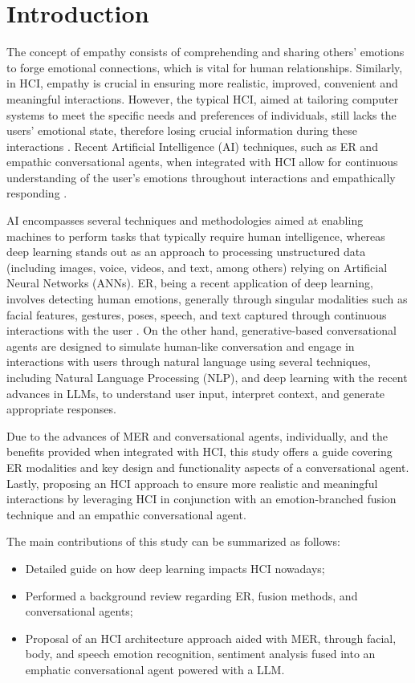\documentclass[runningheads]{llncs}
\begin{document}
\section{Introduction}

The concept of empathy consists of comprehending and sharing others' emotions to forge emotional connections, which is vital for human relationships. Similarly, in HCI, empathy is crucial in ensuring more realistic, improved, convenient and meaningful interactions. However, the typical HCI, aimed at tailoring computer systems to meet the specific needs and preferences of individuals, still lacks the users' emotional state, therefore losing crucial information during these interactions \cite{jaiswal_facial_2020}.  Recent Artificial Intelligence (AI) techniques, such as ER and empathic conversational agents, when integrated with HCI allow for continuous understanding of the user's emotions throughout interactions and empathically responding \cite{santos_approaches_2018}.

AI encompasses several techniques and methodologies aimed at enabling machines to perform tasks that typically require human intelligence, whereas deep learning stands out as an approach to processing unstructured data (including images, voice, videos, and text, among others) relying on Artificial Neural Networks (ANNs). ER, being a recent application of deep learning, involves detecting human emotions, generally through singular modalities such as facial features, gestures, poses, speech, and text captured through continuous interactions with the user \cite{alrowais_modified_2023}. On the other hand, generative-based conversational agents are designed to simulate human-like conversation and engage in interactions with users through natural language using several techniques, including Natural Language Processing (NLP), and deep learning with the recent advances in LLMs, to understand user input, interpret context, and generate appropriate responses.

Due to the advances of MER and conversational agents, individually, and the benefits provided when integrated with HCI, this study offers a guide covering ER modalities and key design and functionality aspects of a conversational agent. Lastly, proposing an HCI approach to ensure more realistic and meaningful interactions by leveraging HCI in conjunction with an emotion-branched fusion technique and an empathic conversational agent.
 
The main contributions of this study can be summarized as follows:
\begin{itemize}
	\item Detailed guide on how deep learning impacts HCI nowadays;
	\item Performed a background review regarding ER, fusion methods, and conversational agents;
	\item  Proposal of an HCI architecture approach aided with MER, through facial, body, and speech emotion recognition, sentiment analysis fused into an emphatic conversational agent powered with a LLM.
\end{itemize}
\end{document}
